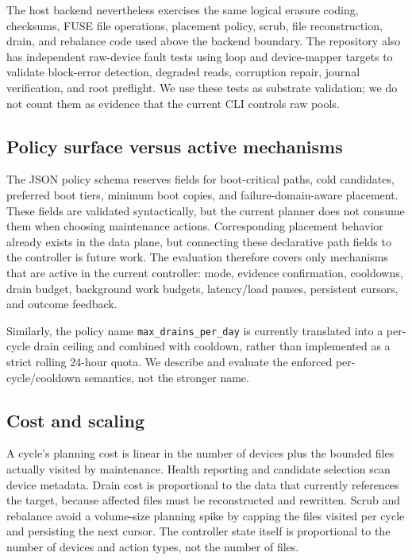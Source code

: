 The host backend nevertheless exercises the same logical erasure coding, checksums, FUSE file operations, placement policy, scrub, file reconstruction, drain, and rebalance code used above the backend boundary. The repository also has independent raw-device fault tests using loop and device-mapper targets to validate block-error detection, degraded reads, corruption repair, journal verification, and root preflight. We use these tests as substrate validation; we do not count them as evidence that the current \autopilot{} CLI controls raw pools.

\subsection{Policy surface versus active mechanisms}
The JSON policy schema reserves fields for boot-critical paths, cold candidates, preferred boot tiers, minimum boot copies, and failure-domain-aware placement. These fields are validated syntactically, but the current \autopilot{} planner does not consume them when choosing maintenance actions. Corresponding placement behavior already exists in the \argosfs{} data plane, but connecting these declarative path fields to the controller is future work. The evaluation therefore covers only mechanisms that are active in the current controller: mode, evidence confirmation, cooldowns, drain budget, background work budgets, latency/load pauses, persistent cursors, and outcome feedback.

Similarly, the policy name \texttt{max\_drains\_per\_day} is currently translated into a per-cycle drain ceiling and combined with cooldown, rather than implemented as a strict rolling 24-hour quota. We describe and evaluate the enforced per-cycle/cooldown semantics, not the stronger name.

\subsection{Cost and scaling}
A cycle's planning cost is linear in the number of devices plus the bounded files actually visited by maintenance. Health reporting and candidate selection scan device metadata. Drain cost is proportional to the data that currently references the target, because affected files must be reconstructed and rewritten. Scrub and rebalance avoid a volume-size planning spike by capping the files visited per cycle and persisting the next cursor. The controller state itself is proportional to the number of devices and action types, not the number of files.
